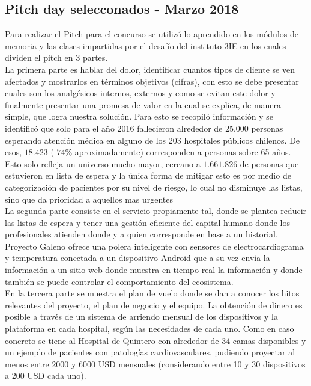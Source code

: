 \subsection{Pitch day selecconados - Marzo 2018}
Para realizar el Pitch para el concurso se utilizó lo aprendido en los módulos de memoria y las clases impartidas por el desafío del instituto 3IE en los cuales dividen el pitch en 3 partes.\\
La primera parte es hablar del dolor, identificar cuantos tipos de cliente se ven afectados y mostrarlos en términos objetivos (cifras), con esto se debe presentar cuales son los analgésicos internos, externos y como se evitan este dolor y finalmente presentar una promesa de valor en la cual se explica, de manera simple, que logra nuestra solución. Para esto se recopiló información y se identificó que solo para el año 2016 fallecieron alrededor de $25.000$ personas esperando atención médica en alguno de los 203 hospitales públicos chilenos. De esos, $18.423$ ( $74\%$ aproximadamente) corresponden a personas sobre 65 años. Esto solo refleja un universo mucho mayor, cercano a $1.661.826$ de personas que estuvieron en lista de espera y la única forma de mitigar esto es por medio de categorización de pacientes por su nivel de riesgo, lo cual no disminuye las listas, sino que da prioridad a aquellos mas urgentes\\
La segunda parte consiste en el servicio propiamente tal, donde se plantea reducir las listas de espera y tener una gestión eficiente del capital humano donde los profesionales atienden donde y a quien corresponde en base a un historial. Proyecto Galeno ofrece una polera inteligente con sensores de electrocardiograma y temperatura conectada a un dispositivo Android que a su vez envía la información a un sitio web donde muestra en tiempo real la información y donde también se puede controlar el comportamiento del ecosistema.\\
En la tercera parte se muestra el plan de vuelo donde se dan a conocer los hitos relevantes del proyecto, el plan de negocio y el equipo. La obtención de dinero es posible a través de un sistema de arriendo mensual de los dispositivos y la plataforma en cada hospital, según las necesidades de cada uno. Como en caso concreto se tiene al Hospital de Quintero con alrededor de 34 camas disponibles y un ejemplo de pacientes con patologías cardiovasculares, pudiendo proyectar al menos entre $2000$ y $6000$ USD mensuales (considerando entre 10 y 30 dispositivos a $200$ USD cada uno).\\

